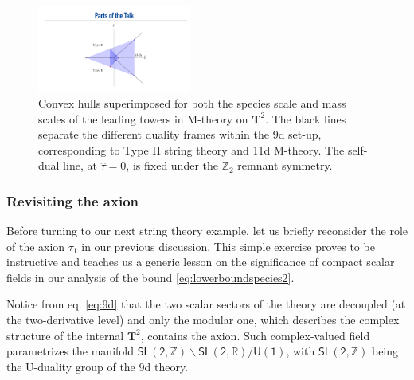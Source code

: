 \begin{figure}[htb]
\begin{center}
\includegraphics[width=0.45\textwidth]{CH-2.pdf}
\caption{\small Convex hulls superimposed for both the species scale and mass scales of the leading towers in M-theory on $\mathbf{T}^2$. The black lines separate the different duality frames within the 9d set-up, corresponding to Type II string theory and 11d M-theory. The self-dual line, at $\hat{\tau}=0$, is fixed under the $\mathbb{Z}_2$ remnant symmetry.} 
\label{fig:ch2}
\end{center}
\end{figure}

\subsubsection*{Revisiting the axion}
\label{sss:axions}

Before turning to our next string theory example, let us briefly reconsider the role of the axion $\tau_1$ in our previous discussion. This simple exercise proves to be instructive and teaches us a generic lesson on the significance of compact scalar fields in our analysis of the bound \eqref{eq:lowerboundspecies2}.

Notice from eq. \eqref{eq:9d} that the two scalar sectors of the theory are decoupled (at the two-derivative level) and only the modular one, which describes the complex structure of the internal $\mathbf{T}^2$, contains the axion. Such complex-valued field parametrizes the manifold $\mathsf{SL(2, \mathbb{Z})}\backslash \mathsf{SL(2, \mathbb{R})}/\mathsf{U(1)}$, with $\mathsf{SL(2, \mathbb{Z})}$ being the U-duality group of the 9d theory.

